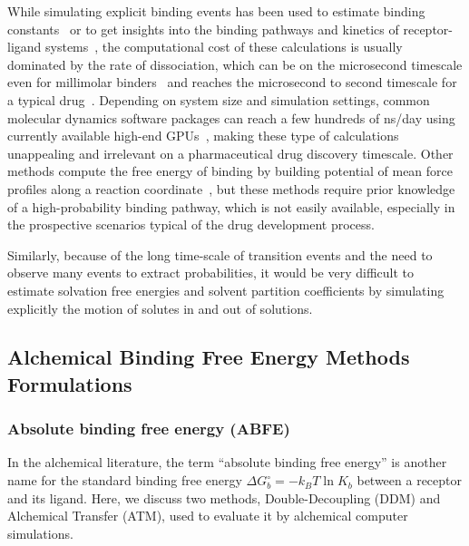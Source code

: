 \documentclass[9pt,bestpractices]{livecoms}
\begin{document}
While simulating explicit binding events has been used to estimate binding constants~\cite{jong2011determining,pan2017quantitative} or to get insights into the binding pathways and kinetics of receptor-ligand systems~\cite{teo2016adaptive,votapka2017seekr,doerr2014onthefly,plattner2015protein,dixon2018predicting}, the computational cost of these calculations is usually dominated by the rate of dissociation, which can be on the microsecond timescale even for millimolar binders~\cite{pan2017quantitative} and reaches the microsecond to second timescale for a typical drug~\cite{basavapathruni2012conformational,hyre2006cooperative}.
Depending on system size and simulation settings, common molecular dynamics software packages can reach a few hundreds of ns/day using currently available high-end GPUs~\cite{eastman2017openmm,kutzner2019more}, making these type of calculations unappealing and irrelevant on a pharmaceutical drug discovery timescale.
Other methods compute the free energy of binding by building potential of mean force profiles along a reaction coordinate~\cite{woo2005calculation,velez-vega2013overcoming,limongelli2013funnel,heinzelmann2017attachpullrelease}, but these methods require prior knowledge of a high-probability binding pathway, which is not easily available, especially in the prospective scenarios typical of the drug development process.

Similarly, because of the long time-scale of transition events and the need to observe many events to extract probabilities, it would be very difficult to estimate solvation free energies and solvent partition coefficients by simulating explicitly the motion of solutes in and out of solutions.

\subsection{Alchemical Binding Free Energy Methods Formulations}
\label{subsec:formulations-abfe-rbfe}

\subsubsection{Absolute binding free energy (ABFE)}
\label{sec:theory-abfe}

In the alchemical literature, the term ``absolute binding free energy'' is another name for the standard binding free energy $\Delta G^\circ_b = - k_B T \ln K_b$ between a receptor and its ligand.  Here, we discuss two methods, Double-Decoupling (DDM) and Alchemical Transfer (ATM), used to evaluate it by alchemical computer simulations.
\end{document}
